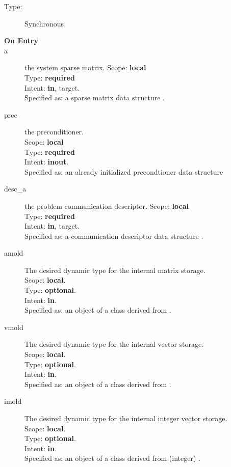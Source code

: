 \begin{description}
\item[Type:] Synchronous.
\item[\bf On Entry]
\item[a] the system sparse matrix.
Scope: {\bf local} \\
Type: {\bf required}\\
Intent: {\bf in}, target.\\
Specified as: a sparse matrix data structure \spdata.
\item[prec] the preconditioner.\\
Scope: {\bf local} \\
Type: {\bf required}\\
Intent: {\bf inout}.\\
Specified as: an already initialized precondtioner data structure \precdata\\
\item[desc\_a] the problem communication descriptor. 
Scope: {\bf local} \\
Type: {\bf required}\\
Intent: {\bf in}, target.\\
Specified as: a communication descriptor data structure \descdata.
\item[amold] The desired dynamic type for the internal matrix storage.\\
Scope: {\bf local}.\\
Type: {\bf optional}.\\
Intent: {\bf in}.\\
Specified as: an object of a class derived from \spbasedata. 
\item[vmold] The desired dynamic type for the internal vector storage.\\
Scope: {\bf local}.\\
Type: {\bf optional}.\\
Intent: {\bf in}.\\
Specified as: an object of a class derived from \vbasedata. 
\item[imold] The desired dynamic type for the internal integer vector storage.\\
Scope: {\bf local}.\\
Type: {\bf optional}.\\
Intent: {\bf in}.\\
Specified as: an object of a class derived from (integer) \vbasedata. 
\end{description}

